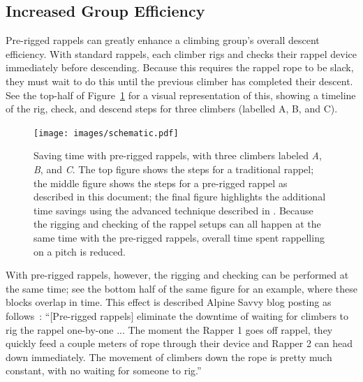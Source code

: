 \documentclass[nonacm,acmtog]{acmart}
\begin{document}
\subsection{Increased Group Efficiency}
\label{sec:efficiency}

  Pre-rigged rappels can greatly enhance a climbing group's overall descent
  efficiency.  With standard rappels, each climber rigs and checks their rappel
  device immediately before descending.  Because this requires the rappel rope
  to be slack, they must wait to do this until the previous climber has
  completed their descent.  See the top-half of Figure~\ref{fig:schematic} for
  a visual representation of this, showing a timeline of the rig, check, and
  descend steps for three climbers (labelled A, B, and C).

  \begin{figure}
   \texttt{[image: images/schematic.pdf]}
   \caption{Saving time with pre-rigged rappels, with three climbers labeled
   {\it A}, {\it B}, and {\it C}.  The top figure shows the steps for a
   traditional rappel; the middle figure shows the steps for a pre-rigged
   rappel as described in this document; the final figure highlights the
   additional time savings using the advanced technique described in
   .  Because the rigging and checking of the rappel
   setups can all happen at the same time with the pre-rigged rappels, overall
   time spent rappelling on a pitch is reduced.} \label{fig:schematic}
  \end{figure}

  With pre-rigged rappels, however, the rigging and checking can be performed
  at the same time; see the bottom half of the same figure for an example,
  where these blocks overlap in time.  This effect is described Alpine Savvy
  blog posting as follows~\cite{alpinesavvy:pre-rigged-rappels}: ``[Pre-rigged
  rappels] eliminate the downtime of waiting for climbers to rig the rappel
  one-by-one ...  The moment the Rapper 1 goes off rappel, they quickly feed a
  couple meters of rope through their device and Rapper 2 can head down
  immediately. The movement of climbers down the rope is pretty much constant,
  with no waiting for someone to rig.''

\end{document}
